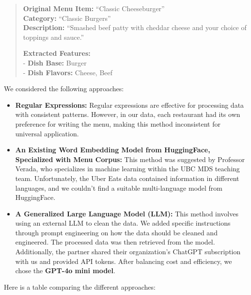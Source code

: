 \documentclass[
  11pt,
  a4paper,
  DIV=11,
  numbers=noendperiod]{scrartcl}
\providecommand{\tightlist}{%
  \setlength{\itemsep}{0pt}\setlength{\parskip}{0pt}}\usepackage{longtable,booktabs,array}
\begin{document}
\begin{quote}
\textbf{Original Menu Item:} ``Classic Cheeseburger''\\
\textbf{Category:} ``Classic Burgers''\\
\textbf{Description:} ``Smashed beef patty with cheddar cheese and your
choice of toppings and sauce.''

\textbf{Extracted Features:}\\
- \textbf{Dish Base:} Burger\\
- \textbf{Dish Flavors:} Cheese, Beef
\end{quote}

We considered the following approaches:

\begin{itemize}
\tightlist
\item
  \textbf{Regular Expressions:} Regular expressions are effective for
  processing data with consistent patterns. However, in our data, each
  restaurant had its own preference for writing the menu, making this
  method inconsistent for universal application.
\item
  \textbf{An Existing Word Embedding Model from HuggingFace, Specialized
  with Menu Corpus:} This method was suggested by Professor Verada, who
  specializes in machine learning within the UBC MDS teaching team.
  Unfortunately, the Uber Eats data contained information in different
  languages, and we couldn't find a suitable multi-language model from
  HuggingFace.
\item
  \textbf{A Generalized Large Language Model (LLM):} This method
  involves using an external LLM to clean the data. We added specific
  instructions through prompt engineering on how the data should be
  cleaned and engineered. The processed data was then retrieved from the
  model. Additionally, the partner shared their organization's ChatGPT
  subscription with us and provided API tokens. After balancing cost and
  efficiency, we chose the \textbf{GPT-4o mini model}.
\end{itemize}

Here is a table comparing the different approaches:
\end{document}
